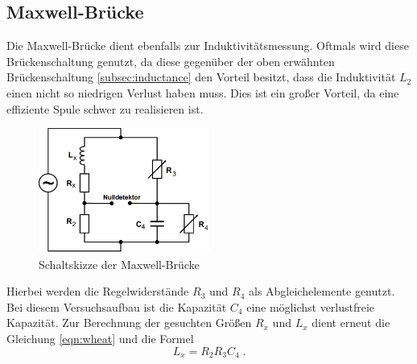 \subsection{Maxwell-Brücke}
Die Maxwell-Brücke dient ebenfalls zur Induktivitätsmessung. Oftmals wird diese Brückenschaltung genutzt, da diese gegenüber der oben erwähnten Brückenschaltung 
\ref{subsec:inductance} den Vorteil besitzt, dass die Induktivität $L_2$ einen nicht so niedrigen Verlust haben muss. Dies ist ein großer Vorteil, da eine 
effiziente Spule schwer zu realisieren ist.
\begin{figure}
    \centering
    \caption{Schaltskizze der Maxwell-Brücke}
    \label{fig:maxwell}
    \includegraphics[width=0.5\textwidth]{bridges/maxwell.png}
\end{figure}
Hierbei werden die Regelwiderstände $R_3$ und $R_4$ als Abgleichelemente genutzt. Bei diesem Versuchsaufbau ist die Kapazität $C_4$ eine möglichst verlustfreie 
Kapazität. Zur Berechnung der gesuchten Größen $R_x$ und $L_x$ dient erneut die Gleichung \eqref{eqn:wheat} und die Formel
\begin{equation}
    L_x = R_2 R_3 C_4 \label{eqn:inducmesmaxwell} \; \text{.}
\end{equation}
